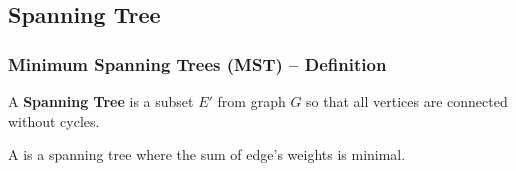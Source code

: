 
\subsection{Spanning Tree}
\begin{frame}
  \frametitle{Minimum Spanning Trees (MST) -- Definition}

  \begin{block}{}
    A {\bf Spanning Tree} is a subset $E'$ from graph $G$ so
    that all vertices are connected without cycles.

    \medskip

    A  is a spanning tree where the
    sum of edge's weights is minimal.
  \end{block}


\end{frame}
